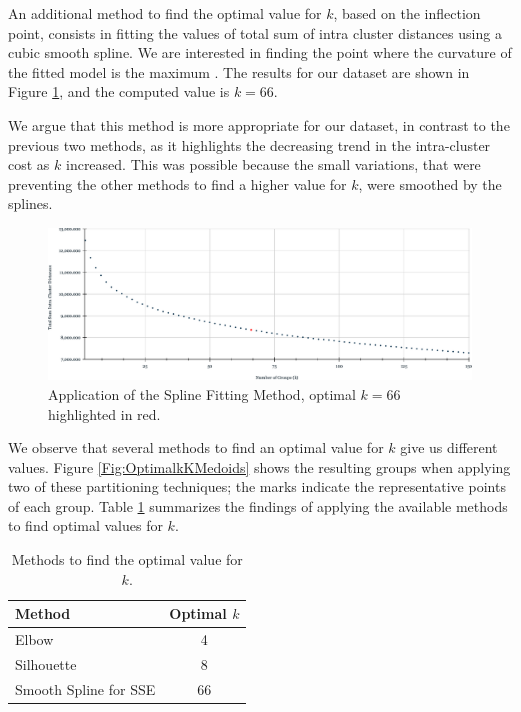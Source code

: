 An additional method to find the optimal value for $k$, based on the inflection point, consists in fitting the values of total sum of intra cluster distances using a cubic smooth spline. We are interested in finding the point where the curvature of the fitted model is the maximum \cite{Akima1970}. The results for our dataset are shown in Figure \ref{Fig:SmoothSpline-kMedoids}, and the computed value is $k = 66$.

We argue that this method is more appropriate for our dataset, in contrast to the previous two methods, as it highlights the decreasing trend in the intra-cluster cost as $k$ increased. This was possible because the small variations, that were preventing the other methods to find a higher value for $k$, were smoothed by the splines.

\begin{figure}[h]
	\centering
	\includegraphics[scale=0.5]{../Figures/SmoothSpline-kMedoids}
	\caption{Application of the Spline Fitting Method, optimal $k=66$ highlighted in red.}
	\label{Fig:SmoothSpline-kMedoids}
\end{figure}

We observe that several methods to find an optimal value for $k$ give us different values. Figure \ref{Fig:OptimalkKMedoids} shows the resulting groups when applying two of these partitioning techniques; the marks indicate the representative points of each group. 
Table \ref{Table:ValidationIndex} summarizes the findings of applying the available methods to find optimal values for $k$.
\begin{table}[h]
	\centering
	\small
	\begin{tabular}{|l|c|}
		\hline
		Method & Optimal $k$ \\ \hline
		Elbow  & 4	\\
		Silhouette & 8	\\
		Smooth Spline for SSE & 66\\ \hline
	\end{tabular}
\caption{Methods to find the optimal value for $k$.}
\label{Table:ValidationIndex}
\end{table}
		
